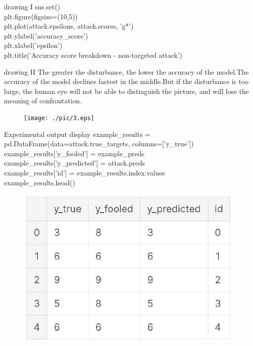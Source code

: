 \documentclass[
 size=14pt,
 paper=smartboard,  %
 mode=present, 		%
 display=slides, 	%
 style=tuliplab,  	%
 pauseslide,
 fleqn,leqno]{powerdot}
\begin{document}
\begin{slide}[toc=,bm=]{drawing I}
	sns.set()\\
	plt.figure(figsize=(10,5))\\
	plt.plot(attack.epsilons, attack.scores, 'g*')\\
	plt.ylabel('accuracy_score')\\
	plt.xlabel('epsilon')\\
	plt.title('Accuracy score breakdown - non-targeted attack')\\
	
\end{slide}

\begin{slide}[toc=,bm=]{drawing II}
		The greater the disturbance, the lower the accuracy of the model.The accuracy of the model declines fastest in the middle.But if the disturbance is too large, the human eye will not be able to distinguish the picture, and will lose the meaning of confrontation.
	\begin{center}
		\begin{figure}[htbp]
			\texttt{[image: ./pic/3.eps]}
		\end{figure}
	\end{center}
\end{slide}

\begin{slide}[toc=,bm=]{Experimental output display}
example_results = pd.DataFrame(data=attack.true_targets, columns=['y_true'])\\
example_results['y_fooled'] = example_preds\\
example_results['y_predicted'] = attack.preds\\
example_results['id'] = example_results.index.values\\
example_results.head()
		\begin{figure}[htbp]
			\includegraphics[scale=0.9]{./pic/4.eps}
		\end{figure}
	
\end{slide}
\end{document}
